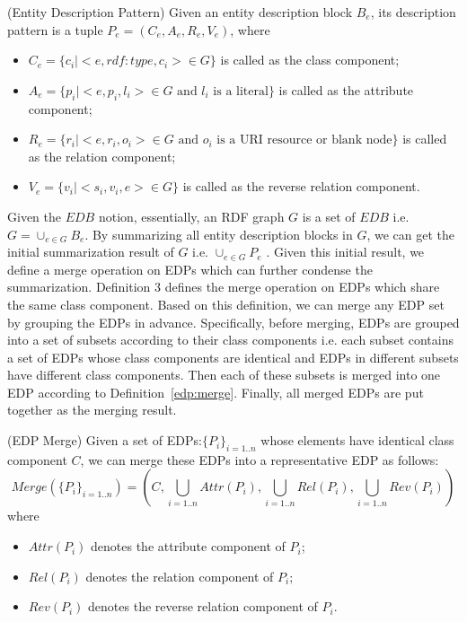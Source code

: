 \begin{definition}
\label{def:edp} 
(Entity Description Pattern) Given an entity description block $B_e$, its description pattern is a tuple $P_e=(C_e,A_e,R_e,V_e)$, where
\begin{itemize}
\item $C_e=\{c_i |<e,rdf:type,c_i> \in G\}$   is called as the class component; 
\item $A_e=\{p_i |<e,p_i,l_i> \in G \text{ and $l_i$  is a literal}\}$  is called as the attribute component;
\item $R_e=\{r_i |<e,r_i,o_i> \in G \text{ and $o_i$  is a URI resource or blank node}\}$  is called as the relation component;
\item $V_e=\{v_i |<s_i,v_i,e> \in G\}$ is called as the reverse relation component.
\end{itemize}
\end{definition}

Given the $EDB$ notion, essentially, an RDF graph $G$ is a set of $EDB$ i.e. $G=\cup_{e \in G}{B_e}$. By summarizing all entity description blocks in $G$, we can get the initial summarization result of $G$ i.e. $\cup_{e \in G}{P_e}$ . Given this initial result, we define a merge operation on EDPs which can further condense the summarization. Definition 3 defines the merge operation on EDPs which share the same class component. Based on this definition, we can merge any EDP set by grouping the EDPs in advance. Specifically, before merging, EDPs are grouped into a set of subsets according to their class components i.e. each subset contains a set of EDPs whose class components are identical and EDPs in different subsets have different class components. Then each of these subsets is merged into one EDP according to Definition~\ref{edp:merge}. Finally, all merged EDPs are put together as the merging result.

\begin{definition} 
\label{edp:merge}
(EDP Merge)  Given a set of EDPs:$\{P_i\}_{i=1..n}$ whose elements have identical class component $C$, we can merge these EDPs into a representative EDP as follows:
\begin{equation}
Merge(\{P_i\}_{i=1..n})=(C, \bigcup_{i=1..n}{Attr(P_i)}, \bigcup_{i=1..n}{Rel(P_i)}, \bigcup_{i=1..n}{Rev(P_i)})
\end{equation}
where
\begin{itemize}
\item $Attr(P_i)$ denotes the attribute component of $P_i$;
\item $Rel(P_i)$ denotes the relation component of $P_i$;
\item $Rev(P_i)$ denotes the reverse relation component of $P_i$.
\end{itemize}
\end{definition}

